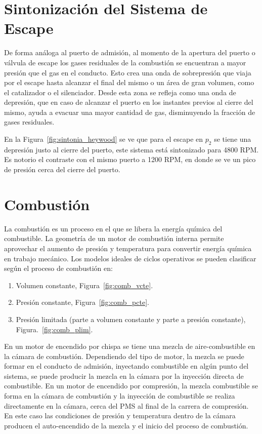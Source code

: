 \section{Sintonización del Sistema de Escape}\label{cap2_sec_sintonia_escape}

De forma análoga al puerto de admisión, al momento de la apertura del puerto o
válvula de escape los gases residuales de la combustión se encuentran a  mayor
presión que el gas en el conducto.
%
Esto crea una onda de sobrepresión que viaja por el escape hasta alcanzar el
final del mismo o un área de gran volumen, como el catalizador o el silenciador.
%
Desde esta zona se refleja como una onda de depresión, que en caso de alcanzar
el puerto en los instantes previos al cierre del mismo, ayuda a evacuar una
mayor cantidad de gas, disminuyendo la fracción de gases residuales.

En la Figura~\ref{fig:sintonia_heywood} se ve que para el escape en $p_2$ se
tiene una depresión justo al cierre del puerto, este sistema está sintonizado
para 4800 RPM.
%
Es notorio el contraste con el mismo puerto a 1200 RPM, en donde se ve un pico de
presión cerca del cierre del puerto.
%

\section{Combustión}
%
La combustión es un proceso en el que se libera la energía química del
combustible.
%
La geometría de un motor de combustión interna permite aprovechar
el aumento de presión y temperatura para convertir energía química en trabajo
mecánico.
%
Los modelos ideales de ciclos operativos se pueden clasificar según el proceso
de combustión en:
%
\begin{enumerate}
    \item Volumen constante, Figura~\ref{fig:comb_vcte}.
    \item Presión constante, Figura~\ref{fig:comb_pcte}.
    \item Presión limitada (parte a volumen constante y parte a presión
constante), Figura.~\ref{fig:comb_plim}.
\end{enumerate}

En un motor de encendido por chispa se tiene una mezcla de aire-combustible en
la cámara de combustión.
%
Dependiendo del tipo de motor, la mezcla se puede formar en el conducto de
admisión, inyectando combustible en algún punto del sistema, se puede producir
la mezcla en la cámara por la inyección directa de combustible.
%
En un motor de encendido por compresión, la mezcla combustible se forma en la
cámara de combustión y la inyección de combustible se realiza directamente en la
cámara, cerca del PMS al final de la carrera de compresión.
%
En este caso las condiciones de presión y temperatura dentro de la cámara producen el
auto-encendido de la mezcla y el inicio del proceso de combustión.

